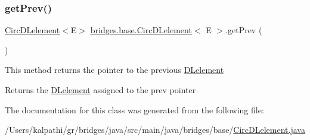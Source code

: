 \subsubsection{\texorpdfstring{getPrev()}{getPrev()}}
{\footnotesize\ttfamily \mbox{\hyperlink{classbridges_1_1base_1_1_circ_d_lelement}{Circ\+D\+Lelement}}$<$E$>$ \mbox{\hyperlink{classbridges_1_1base_1_1_circ_d_lelement}{bridges.\+base.\+Circ\+D\+Lelement}}$<$ E $>$.get\+Prev (\begin{DoxyParamCaption}{ }\end{DoxyParamCaption})}

This method returns the pointer to the previous \mbox{\hyperlink{classbridges_1_1base_1_1_d_lelement}{D\+Lelement}}

\begin{DoxyReturn}{Returns}
the \mbox{\hyperlink{classbridges_1_1base_1_1_d_lelement}{D\+Lelement}} assigned to the prev pointer 
\end{DoxyReturn}


The documentation for this class was generated from the following file\+:\begin{DoxyCompactItemize}
\item 
/\+Users/kalpathi/gr/bridges/java/src/main/java/bridges/base/\mbox{\hyperlink{_circ_d_lelement_8java}{Circ\+D\+Lelement.\+java}}\end{DoxyCompactItemize}
